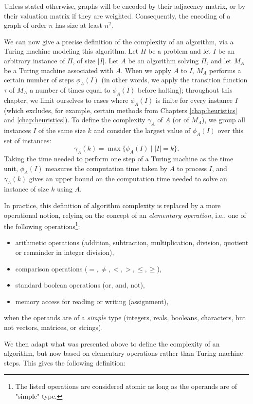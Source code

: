 Unless stated otherwise, graphs will be encoded by their adjacency matrix, or by their valuation matrix if they are weighted. Consequently, the encoding of a graph of order \( n \) has size at least \( n^2 \).

We can now give a precise definition of the complexity of an algorithm, via a Turing machine modeling this algorithm. Let $\Pi$ be a problem and let $I$ be an arbitrary instance of $\Pi$, of size $|I|$. Let $A$ be an algorithm solving $\Pi$, and let $M_A$ be a Turing machine associated with $A$. When we apply $A$ to $I$, $M_A$ performs a certain number of steps $\phi_A(I)$ (in other words, we apply the transition function $\tau$ of $M_A$ a number of times equal to $\phi_A(I)$ before halting); throughout this chapter, we limit ourselves to cases where $\phi_A(I)$ is finite for every instance $I$ (which excludes, for example, certain methods from Chapters \ref{chap:heuristics} and \ref{chap:heuristics}). To define the complexity $\gamma_A$ of $A$ (or of $M_A$), we group all instances $I$ of the same size $k$ and consider the largest value of $\phi_A(I)$ over this set of instances:
\[
\gamma_A(k) = \max\{\phi_A(I) \mid |I| = k\}.
\]
Taking the time needed to perform one step of a Turing machine as the time unit, $\phi_A(I)$ measures the computation time taken by $A$ to process $I$, and $\gamma_A(k)$ gives an upper bound on the computation time needed to solve an instance of size $k$ using $A$.

In practice, this definition of algorithm complexity is replaced by a more operational notion, relying on the concept of an \textit{elementary operation}, i.e., one of the following operations\footnote{The listed operations are considered atomic as long as the operands are of "simple" type.}:
\begin{itemize}
    \item arithmetic operations (addition, subtraction, multiplication, division, quotient or remainder in integer division),
    \item comparison operations ($=, \neq, <, >, \leq, \geq$),
    \item standard boolean operations (or, and, not),
    \item memory access for reading or writing (assignment),
\end{itemize}
when the operands are of a \textit{simple} type (integers, reals, booleans, characters, but not vectors, matrices, or strings).

We then adapt what was presented above to define the complexity of an algorithm, but now based on elementary operations rather than Turing machine steps. This gives the following definition:

